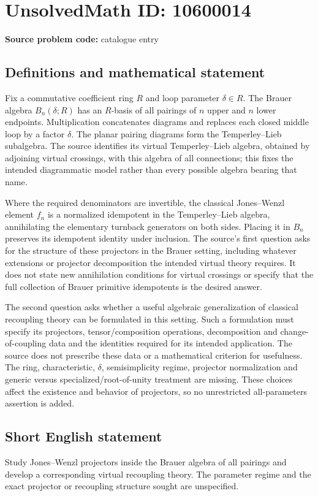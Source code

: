 \documentclass[11pt]{article}
\begin{document}
\section*{UnsolvedMath ID: 10600014}
\textbf{Source problem code:} catalogue entry
\subsection{Definitions and mathematical statement}
Fix a commutative coefficient ring \(R\) and loop parameter \(\delta\in R\). The Brauer algebra \(B_n(\delta;R)\) has an \(R\)-basis of all pairings of \(n\) upper and \(n\) lower endpoints. Multiplication concatenates diagrams and replaces each closed middle loop by a factor \(\delta\). The planar pairing diagrams form the Temperley--Lieb subalgebra. The source identifies its virtual Temperley--Lieb algebra, obtained by adjoining virtual crossings, with this algebra of all connections; this fixes the intended diagrammatic model rather than every possible algebra bearing that name.

Where the required denominators are invertible, the classical Jones--Wenzl element \(f_n\) is a normalized idempotent in the Temperley--Lieb algebra, annihilating the elementary turnback generators on both sides. Placing it in \(B_n\) preserves its idempotent identity under inclusion. The source's first question asks for the structure of these projectors in the Brauer setting, including whatever extensions or projector decomposition the intended virtual theory requires. It does not state new annihilation conditions for virtual crossings or specify that the full collection of Brauer primitive idempotents is the desired answer.

The second question asks whether a useful algebraic generalization of classical recoupling theory can be formulated in this setting. Such a formulation must specify its projectors, tensor/composition operations, decomposition and change-of-coupling data and the identities required for its intended application. The source does not prescribe these data or a mathematical criterion for usefulness. The ring, characteristic, \(\delta\), semisimplicity regime, projector normalization and generic versus specialized/root-of-unity treatment are missing. These choices affect the existence and behavior of projectors, so no unrestricted all-parameters assertion is added.
\subsection{Short English statement}
Study Jones--Wenzl projectors inside the Brauer algebra of all pairings and develop a corresponding virtual recoupling theory. The parameter regime and the exact projector or recoupling structure sought are unspecified.
\end{document}
